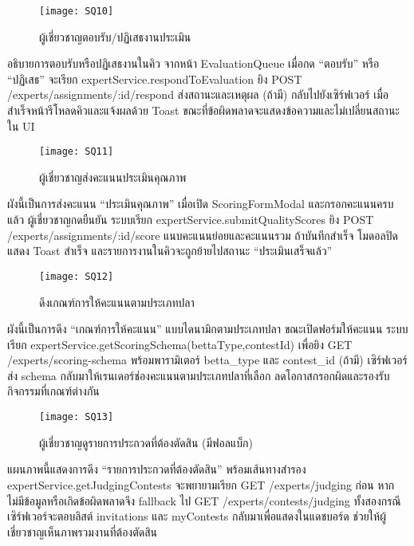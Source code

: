 \newpage

\begin{figure}[h]
	\centering
	\texttt{[image: SQ10]}
	\caption{ผู้เชี่ยวชาญตอบรับ/ปฏิเสธงานประเมิน}
\end{figure}

\indent อธิบายการตอบรับหรือปฏิเสธงานในคิว จากหน้า EvaluationQueue เมื่อกด “ตอบรับ” หรือ “ปฏิเสธ” จะเรียก expertService.respondToEvaluation ยิง POST /experts/assignments/:id/respond ส่งสถานะและเหตุผล (ถ้ามี) กลับไปยังเซิร์ฟเวอร์ เมื่อสำเร็จหน้ารีโหลดคิวและแจ้งผลด้วย Toast ขณะที่ข้อผิดพลาดจะแสดงข้อความและไม่เปลี่ยนสถานะใน UI

\vspace{\baselineskip}

\begin{figure}[h]
	\centering
	\texttt{[image: SQ11]}
	\caption{ผู้เชี่ยวชาญส่งคะแนนประเมินคุณภาพ}
\end{figure}

\indent ผังนี้เป็นการส่งคะแนน “ประเมินคุณภาพ” เมื่อเปิด ScoringFormModal และกรอกคะแนนครบแล้ว ผู้เชี่ยวชาญกดยืนยัน ระบบเรียก expertService.submitQualityScores ยิง POST /experts/assignments/:id/score แนบคะแนนย่อยและคะแนนรวม ถ้าบันทึกสำเร็จ โมดอลปิด แสดง Toast สำเร็จ และรายการงานในคิวจะถูกย้ายไปสถานะ “ประเมินเสร็จแล้ว”

\newpage

\begin{figure}[h]
	\centering
	\texttt{[image: SQ12]}
	\caption{ดึงเกณฑ์การให้คะแนนตามประเภทปลา}
\end{figure}

\indent ผังนี้เป็นการดึง “เกณฑ์การให้คะแนน” แบบไดนามิกตามประเภทปลา ขณะเปิดฟอร์มให้คะแนน ระบบเรียก expertService.getScoringSchema(bettaType,{contestId}) เพื่อยิง GET /experts/scoring-schema พร้อมพารามิเตอร์ betta\_type และ contest\_id (ถ้ามี) เซิร์ฟเวอร์ส่ง schema กลับมาให้เรนเดอร์ช่องคะแนนตามประเภทปลาที่เลือก ลดโอกาสกรอกผิดและรองรับกิจกรรมที่เกณฑ์ต่างกัน

\vspace{\baselineskip}

\begin{figure}[h]
	\centering
	\texttt{[image: SQ13]}
	\caption{ผู้เชี่ยวชาญดูรายการประกวดที่ต้องตัดสิน (มีฟอลแบ็ก)}
\end{figure}

\indent แผนภาพนี้แสดงการดึง “รายการประกวดที่ต้องตัดสิน” พร้อมเส้นทางสำรอง expertService.getJudgingContests จะพยายามเรียก GET /experts/judging ก่อน หากไม่มีข้อมูลหรือเกิดข้อผิดพลาดจึง fallback ไป GET /experts/contests/judging ทั้งสองกรณีเซิร์ฟเวอร์จะตอบลิสต์ invitations และ myContests กลับมาเพื่อแสดงในแดชบอร์ด ช่วยให้ผู้เชี่ยวชาญเห็นภาพรวมงานที่ต้องตัดสิน

